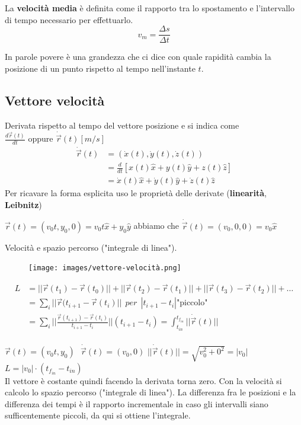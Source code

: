 \begin{definition}
    La \textbf{velocità media} è definita come il rapporto tra lo spostamento e l'intervallo di tempo necessario per effettuarlo.
    $$v_m = \frac{\Delta s}{\Delta t}$$
\end{definition}
\hspace{-15pt}In parole povere è una grandezza che ci dice con quale rapidità cambia la posizione di un punto rispetto al tempo nell'instante $t$.
\subsection*{Vettore velocità}
Derivata rispetto al tempo del vettore posizione e si indica come 
$\frac{d\vec{r}(t)}{dt}\text{ oppure }\dot{\vec{r}}(t)[m/s]$
\begin{equation}
    \begin{split}
    \dot{\vec{r}}(t) & = (\dot{x}(t), \dot{y}(t), \dot{z}(t)) \\
     & = \frac{d}{dt}[x(t)\hat{x} + y(t)\hat{y} + z(t)\hat{z}] \\
     & = \dot{x}(t)\hat{x} + \dot{y}(t)\hat{y} + \dot{z}(t)\hat{z}
    \end{split}
\end{equation}
Per ricavare la forma esplicita uso le proprietà delle derivate (\textbf{linearità}, \textbf{Leibnitz})
\begin{example}
    $\vec{r}(t) = (v_0t, y_0, 0) = v_0t\hat{x} + y_0\hat{y}$ \:\:\:abbiamo che \:\:\:
    $\dot{\vec{r}}(t) = (v_0, 0, 0) = v_0 \hat{x}$
\end{example}
\hspace{-15pt}Velocità e spazio percorso ("integrale di linea").\\
\begin{figure}
    \centering
    \texttt{[image: images/vettore-velocità.png]}
\end{figure}
\begin{align*}
    L & = ||\vec{r}(t_1) - \vec{r}(t_0)|| + ||\vec{r}(t_2) - \vec{r}(t_1)|| + ||\vec{r}(t_3) - \vec{r}(t_2)|| + \dots \\
    & = \sum_i ||\vec{r}(t_{i+1} - \vec{r}(t_i)|| \:\: per\:\: |t_{i+1} - t_i| \text{"piccolo"} \\
    & = \sum_i ||\frac{\vec{r}(t_{i+1}) - \vec{r}(t_i)}{t_{i+1} - t_i}|| (t_{i+1} - t_i) = \int_{t_{in}}^{t_{f_{in}}}||\dot{\vec{r}}(t)||\\
\end{align*}
\begin{example}
    $\vec{r}(t) = (v_0t, y_0)\:\:\: \dot{\vec{r}}(t) = (v_0, 0)$\hspace{15pt}
    $||\dot{\vec{r}}(t)|| = \sqrt{v_0^2 + 0^2} = |v_0|$ \:\:\: $L = |v_0| \cdot (t_{f_{in}} - t_{in})$\\
    Il vettore è costante quindi facendo la derivata torna zero. Con la velocità si calcolo lo spazio percorso ("integrale di linea").
    La differenza fra le posizioni e la differenza dei tempi è il rapporto incrementale in caso gli intervalli siano sufficentemente
    piccoli, da qui si ottiene l'integrale.
\end{example}

